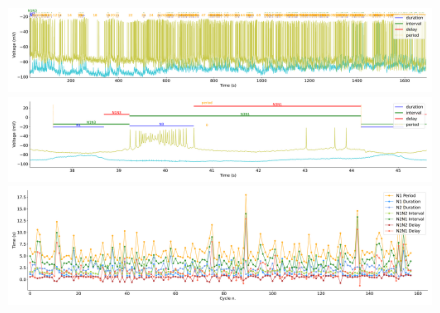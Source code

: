\begin{figure}[htbp]
	\centering
	\begin{minipage}[b]{\textwidth}
		\centering
		\includegraphics[width=\textwidth,height=0.1\textheight]{./invariants/data/SUSSEX/prep1/images/spontaneous_2phases_signal_intervals_zoom.pdf}
		\includegraphics[width=\textwidth]{./invariants/data/SUSSEX/prep1/images/spontaneous_2phases_signal_intervals_cycle.pdf}
		\includegraphics[width=\textwidth]{./invariants/data/SUSSEX/prep1/images/spontaneous_2phases_time_cycle.pdf}
	\end{minipage}
	\centering
	\begin{minipage}[b]{0.45\textwidth}
		\centering

\end{minipage}
\end{figure}

